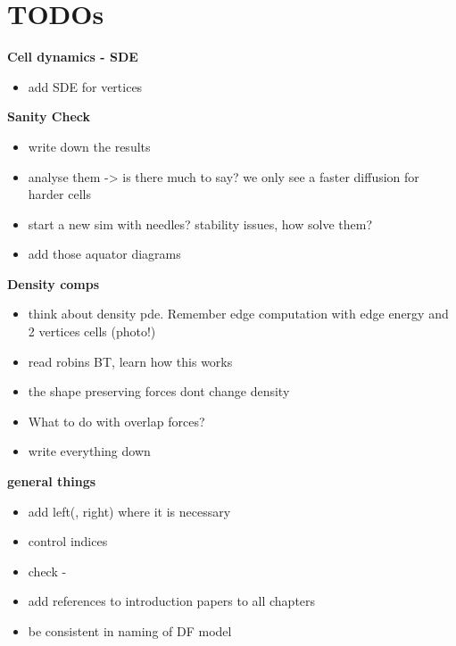 \section{TODOs}

\textbf{Cell dynamics - SDE}
\begin{itemize}
    \item add SDE for vertices
\end{itemize}


\textbf{Sanity Check}
\begin{itemize}
    \item write down the results 
    \item analyse them -> is there much to say? we only see a faster diffusion for harder cells 
    \item start a new sim with needles? stability issues, how solve them? 
    \item add those aquator diagrams 
\end{itemize}

\textbf{Density comps}
\begin{itemize}
    \item think about density pde. Remember edge computation with edge energy and 2 vertices cells (photo!)
    \item read robins BT, learn how this works 
    \item the shape preserving forces dont change density 
    \item What to do with overlap forces?  
    \item write everything down      
\end{itemize}

\textbf{general things}
\begin{itemize}
    \item add left(, right) where it is necessary 
    \item control indices 
    \item check - 
    \item add references to introduction papers to all chapters
    \item be consistent in naming of DF model 
\end{itemize}